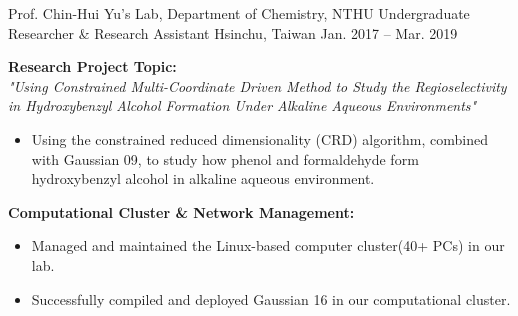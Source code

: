 \begin{cventries}
\cventry
{Prof. Chin-Hui Yu's Lab, Department of Chemistry, NTHU} %
{Undergraduate Researcher \& Research Assistant}
{Hsinchu, Taiwan} %
{Jan. 2017 -- Mar. 2019}
{
\begin{minipage}{\textwidth}
\textbf{Research Project Topic:}\\
\textit{"Using Constrained Multi-Coordinate Driven Method to Study the Regioselectivity in Hydroxybenzyl Alcohol Formation Under Alkaline Aqueous Environments"}
\begin{itemize}
    \item Using the constrained reduced dimensionality (CRD) algorithm, combined with Gaussian 09, to study how phenol and formaldehyde form hydroxybenzyl alcohol in alkaline aqueous environment. 
\end{itemize}
\textbf{Computational Cluster \& Network Management:}
\begin{itemize}
    \item Managed and maintained the Linux-based computer cluster(40+ PCs) in our lab.
    \item Successfully compiled and deployed Gaussian 16 in our computational cluster.
\end{itemize}
\end{minipage}
}



\end{cventries}
